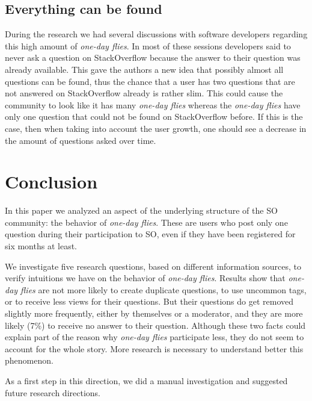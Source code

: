 \documentclass[conference]{IEEEtran}
\newcommand\odf{\emph{one-day flies}\xspace}
\begin{document}
\subsection{Everything can be found}
During the research we had several discussions with software developers
regarding this high amount of \odf. In most of these sessions
developers said to never ask a question on StackOverflow because the answer to
their question was already available. This gave the authors a new idea that
possibly almost all questions can be found, thus the chance that a user has two
questions that are not answered on StackOverflow already is rather slim. This
could cause the community to look like it has many \odf whereas the
\odf have only one question that could not be found on StackOverflow
before. If this is the case, then when taking into account the user growth, one
should see a decrease in the amount of questions asked over time. 

\section{Conclusion}

In this paper we analyzed an aspect of the underlying structure of the
SO community: the behavior of \odf. These are users who post only one question
during their participation to SO, even if they have been registered for six 
months at least. 

We investigate five research questions, based on different information sources,
to verify intuitions we have on the behavior of \odf. Results show that \odf
are not more likely to create duplicate questions, to use uncommon tags, or to
receive less views for their questions. But their questions do get removed
slightly more frequently, either by themselves or a moderator, and they are
more likely (7\%) to receive no answer to their question. Although these two
facts could explain part of the reason why \odf participate less, they do not
seem to account for the whole story. More research is necessary to understand
better this phenomenon.

As a first step in this direction, we did a manual investigation and suggested
future research directions. 





\end{document}
